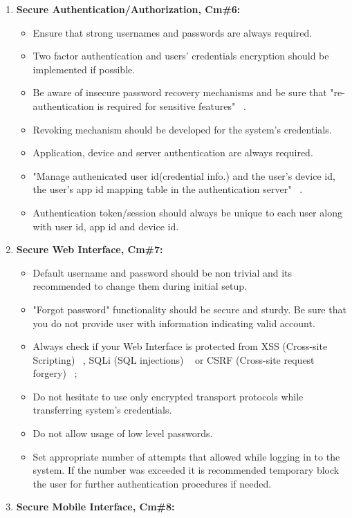 \documentclass[12pt]{article}
\begin{document}
\begin{enumerate}
	\item \textbf{Secure Authentication/Authorization, Cm\#6:}
		\begin{itemize}
			\item Ensure that strong usernames and passwords are always required.
			\item Two factor authentication and users' credentials encryption should be implemented if possible.  
			\item Be aware of insecure  password recovery mechanisms and be sure that "re-authentication is required for sensitive features" ~\cite{OWASP}.
			\item Revoking mechanism should be developed for the system's credentials.
			\item Application, device and server authentication are always required.
			\item "Manage authenicated user id(credential info.) and the user's device id, the user's app id mapping table in the authentication server" ~\cite{OWASP}.
			\item Authentication token/session should always be unique to each user along with  user id, app id and device id.
		\end{itemize}
			\item \textbf{Secure Web Interface, Cm\#7:}
		\begin{itemize}
			\item Default username and password should be non trivial and its recommended to change them during initial setup.
			\item "Forgot password" functionality should be secure and sturdy. Be sure that you do not provide user with information indicating valid account.
			\item Always check if your Web Interface is protected from XSS (Cross-site Scripting) ~\cite{XSS}, SQLi (SQL injections) ~\cite{SQLi} or CSRF (Cross-site request forgery) ~\cite{CSRF};
			\item Do not hesitate to use only encrypted transport protocols while transferring system's credentials.
			\item Do not allow usage of low level passwords.
			\item Set appropriate number of attempts that allowed while logging in to the system. If the number was exceeded it is recommended temporary block the user for further authentication procedures if needed. 
		\end{itemize}
			\item \textbf{Secure Mobile Interface, Cm\#8:}

\end{enumerate}
\end{document}
